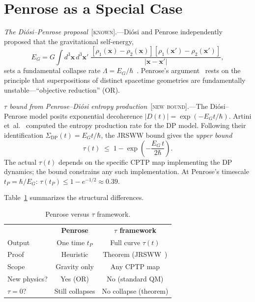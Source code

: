 \documentclass[prl,twocolumn,superscriptaddress,longbibliography,floatfix]{revtex4-2}
\newcommand{\tauasym}{\tau}
\begin{document}
\section{Penrose as a Special Case}
\label{sec:penrose}

\emph{The Di\'{o}si--Penrose proposal}~[\textsc{known}].---Di\'{o}si
and Penrose independently proposed that the gravitational self-energy,
\begin{equation}
E_G = G \!\int\! d^3\mathbf{x}\, d^3\mathbf{x}'\;
\frac{[\rho_1(\mathbf{x}) - \rho_2(\mathbf{x})]
      [\rho_1(\mathbf{x}') - \rho_2(\mathbf{x}')]}{|\mathbf{x}
      - \mathbf{x}'|},
\label{eq:E_G}
\end{equation}
sets a fundamental collapse rate
$\Lambda = E_G/\hbar$~\cite{Diosi1987,Penrose1996}.  Penrose's
argument~\cite{Penrose2014} rests on the principle that superpositions
of distinct spacetime geometries are fundamentally
unstable---``objective reduction'' (OR).

\emph{$\tauasym$ bound from Penrose--Di\'{o}si entropy
production}~[\textsc{new bound}].---The Di\'{o}si--Penrose model
posits exponential decoherence $|D(t)| = \exp(-E_G t/\hbar)$.
Artini et~al.~\cite{Artini2025} computed the entropy production rate
for the DP model.  Following their identification
$\Sigma_{\mathrm{DP}}(t) = E_G t/\hbar$, the JRSWW bound gives
the \emph{upper bound}
\begin{equation}
\boxed{
\tauasym(t) \;\leq\; 1 - \exp\!\left(-\frac{E_G\, t}{2\hbar}\right).
}
\label{eq:tau_penrose}
\end{equation}
The actual $\tauasym(t)$ depends on the specific CPTP map implementing
the DP dynamics; the bound constrains any such implementation.
At Penrose's timescale $t_P = \hbar/E_G$:
$\tauasym(t_P) \leq 1 - e^{-1/2} \approx 0.39$.

Table~\ref{tab:penrose_comparison} summarizes the structural
differences.

\begin{table}[htbp]
\caption{\label{tab:penrose_comparison}Penrose
versus $\tauasym$ framework.}
\begin{ruledtabular}
\begin{tabular}{lcc}
 & \textbf{Penrose} & \textbf{$\tauasym$ framework} \\
\colrule
Output & One time $t_P$ & Full curve $\tauasym(t)$ \\
Proof & Heuristic & Theorem (JRSWW~\cite{Junge2018}) \\
Scope & Gravity only & Any CPTP map \\
New physics? & Yes (OR) & No (standard QM) \\
$\tauasym = 0$? & Still collapses & No collapse (theorem) \\
\end{tabular}
\end{ruledtabular}
\end{table}
\end{document}
